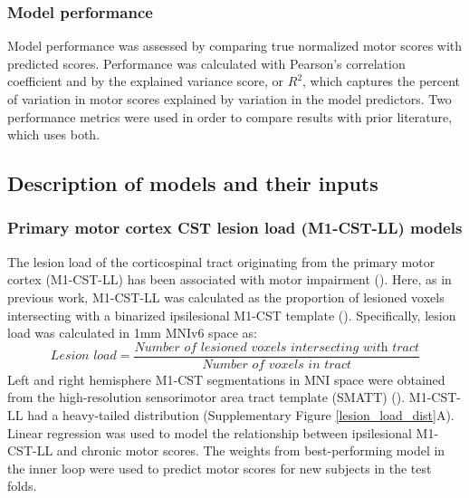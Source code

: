 \documentclass[10pt]{article}
\begin{document}
\subsubsection*{Model performance}
Model performance was assessed by comparing true normalized motor scores with predicted scores. Performance was calculated with Pearson's correlation coefficient and by the explained variance score, or $R^2$, which captures the percent of variation in motor scores explained by variation in the model predictors. Two performance metrics were used in order to compare results with prior literature, which uses both.

\subsection{Description of models and their inputs}
\subsubsection*{Primary motor cortex CST lesion load (M1-CST-LL) models}

The lesion load of the corticospinal tract originating from the primary motor cortex (M1-CST-LL) has been associated with motor impairment (\cite{Stinear2017-eg}). Here, as in previous work, M1-CST-LL was calculated as the proportion of lesioned voxels intersecting with a binarized ipsilesional M1-CST template (\cite{Zhu2010-qh}). Specifically, lesion load was calculated in 1mm MNIv6 space as:
\begin{equation}
    \textit{Lesion load} = \frac{\textit{Number of lesioned voxels intersecting with  tract}}{\textit{Number of voxels in tract}}
\end{equation}
Left and right hemisphere M1-CST segmentations in MNI space were obtained from the high-resolution sensorimotor area tract template (SMATT) (\cite{Archer2018-ti}). M1-CST-LL had a heavy-tailed distribution (Supplementary Figure \ref{lesion_load_dist}A).
Linear regression was used to model the relationship between ipsilesional M1-CST-LL and chronic motor scores. The weights from best-performing model in the inner loop were used to predict motor scores for new subjects in the test folds. 
\end{document}

